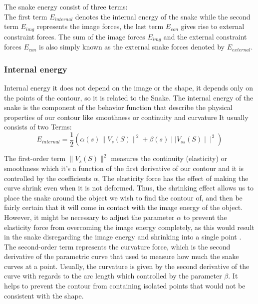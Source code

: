 \hspace{-0.6cm}The snake energy consist of three terms:\\
The first term $E_{internal}$ denotes the internal energy of the snake while the second term $E_{img}$ represents the image
forces, the last term $E_{con}$ gives rise to external constraint forces.
The sum of the image forces $E_{img}$ and the external constraint forces $E_{con}$ is also simply known as
the external snake forces denoted by $E_{external}$.

\subsubsection{Internal energy}
Internal energy it does not depend on the image or the shape, it depends only
on the points of the contour, so it is related to the Snake. The internal energy
of the snake is the component of the behavior function that describe the
physical properties of our contour like smoothness or continuity and curvature
It usually consists of two Terms:
\begin{equation}
        E_{internal} = \frac{1}{2}(\alpha(s)\| V_s (S) \| ^2 + \beta(s)\mid\mid V_{ss} (S) \mid\mid^2)\label{eq:equ04}
\end{equation}

\hspace{-0.6cm}The first-order term $\| V_s (S) \|^2$  measures the continuity (elasticity) or
smoothness which it's a function of the first derivative of our contour and it is
controlled by the coefficients $\alpha$, The elasticity force has the effect of making
the curve shrink even when it is not deformed. Thus, the shrinking effect allows
us to place the snake around the object we wish to find the contour of, and
then be fairly certain that it will come in contact with the image energy of the
object. However, it might be necessary to adjust the parameter $\alpha$ to prevent
the elasticity force from overcoming the image energy completely, as this
would result in the snake disregarding the image energy and shrinking into a
single point \cite{2.4}.\\
The second-order term represents the curvature force, which is the second
derivative of the parametric curve that used to measure how much the snake
curves at a point. Usually, the curvature is given by the second derivative of the
curve with regards to the arc length which controlled by the parameter $\beta$\cite{2.4}. It helps to prevent the contour from
containing isolated points that would not be consistent with the shape.

